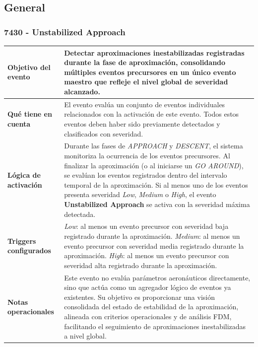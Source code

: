 \documentclass[11pt,a4paper]{article}
\begin{document}
	\subsection{General}
	
	\subsubsection{7430 - Unstabilized Approach}
	
	\begin{longtable}{p{5cm} p{9.5cm}}
		\hline
		\textbf{Objetivo del evento} &
		Detectar aproximaciones inestabilizadas registradas durante la fase de aproximación, consolidando múltiples eventos precursores en un único evento maestro que refleje el nivel global de severidad alcanzado. \\
		\hline
		\textbf{Qué tiene en cuenta} &
		El evento evalúa un conjunto de eventos individuales relacionados con la activación de este evento.
		Todos estos eventos deben haber sido previamente detectados y clasificados con severidad. \\
		\hline
		\textbf{Lógica de activación} &
		Durante las fases de \textit{APPROACH} y \textit{DESCENT}, el sistema monitoriza la ocurrencia de los eventos precursores.  
		Al finalizar la aproximación (o al iniciarse un \textit{GO AROUND}), se evalúan los eventos registrados dentro del intervalo temporal de la aproximación.  
		Si al menos uno de los eventos presenta severidad \textit{Low}, \textit{Medium} o \textit{High}, el evento \textbf{Unstabilized Approach} se activa con la severidad máxima detectada. \\
		\hline
		\textbf{Triggers configurados} &
		\textit{Low}: al menos un evento precursor con severidad baja registrado durante la aproximación. \newline
		\textit{Medium}: al menos un evento precursor con severidad media registrado durante la aproximación. \newline
		\textit{High}: al menos un evento precursor con severidad alta registrado durante la aproximación. \\
		\hline
		\textbf{Notas operacionales} &
		Este evento no evalúa parámetros aeronáuticos directamente, sino que actúa como un agregador lógico de eventos ya existentes.  
		Su objetivo es proporcionar una visión consolidada del estado de estabilidad de la aproximación, alineada con criterios operacionales y de análisis FDM, facilitando el seguimiento de aproximaciones inestabilizadas a nivel global. \\
		\hline
	\end{longtable}
	
\end{document}
